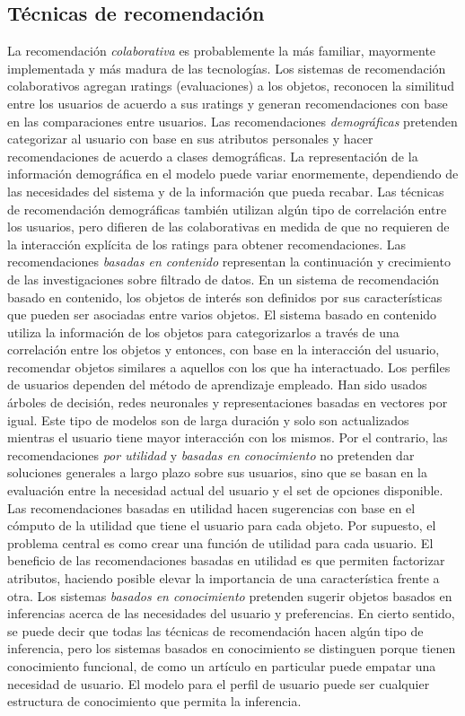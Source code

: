  	\subsection{Técnicas de recomendación}
	 	La recomendación \emph{colaborativa} es probablemente la más familiar, mayormente implementada y más madura de las tecnologías. Los sistemas de recomendación colaborativos agregan \i{ratings} (evaluaciones) a los objetos, reconocen la similitud entre los usuarios de acuerdo a sus \i{ratings} y generan recomendaciones con base en las comparaciones entre usuarios.
	 	Las recomendaciones \emph{demográficas} pretenden categorizar al usuario con base en sus atributos personales y hacer recomendaciones de acuerdo a clases demográficas. La representación de la información demográfica en el modelo puede variar enormemente, dependiendo de las necesidades del sistema y de la información que pueda recabar. Las técnicas de recomendación demográficas también utilizan algún tipo de correlación entre los usuarios, pero difieren de las colaborativas en medida de que no requieren de la interacción explícita de los ratings para obtener recomendaciones. 
	 	Las recomendaciones \emph{basadas en contenido} representan la continuación y crecimiento de las investigaciones sobre filtrado de datos. En un sistema de recomendación basado en contenido, los objetos de interés son definidos por sus características que pueden ser asociadas entre varios objetos. El sistema basado en contenido utiliza la información de los objetos para categorizarlos a través de una correlación entre los objetos y entonces, con base en la interacción del usuario, recomendar objetos similares a aquellos con los que ha interactuado. Los perfiles de usuarios dependen del método de aprendizaje empleado. Han sido usados árboles de decisión, redes neuronales y representaciones basadas en vectores por igual. Este tipo de modelos son de larga duración y solo son actualizados mientras el usuario tiene mayor interacción con los mismos.
	 	Por el contrario, las recomendaciones \emph{por utilidad} y \emph{basadas en conocimiento} no pretenden dar soluciones generales a largo plazo sobre sus usuarios, sino que se basan en la evaluación entre la necesidad actual del usuario y el set de opciones disponible. Las recomendaciones basadas en utilidad hacen sugerencias con base en el cómputo de la utilidad que tiene el usuario para cada objeto. Por supuesto, el problema central es como crear una función de utilidad para cada usuario. El beneficio de las recomendaciones basadas en utilidad es que permiten factorizar atributos, haciendo posible elevar la importancia de una característica frente a otra. 
	 	Los sistemas \emph{basados en conocimiento} pretenden sugerir objetos basados en inferencias acerca de las necesidades del usuario y preferencias. En cierto sentido, se puede decir que todas las técnicas de recomendación hacen algún tipo de inferencia, pero los sistemas basados en conocimiento se distinguen porque tienen conocimiento funcional, de como un artículo en particular puede empatar una necesidad de usuario. El modelo para el perfil de usuario puede ser cualquier estructura de conocimiento que permita la inferencia. \cite{5}

